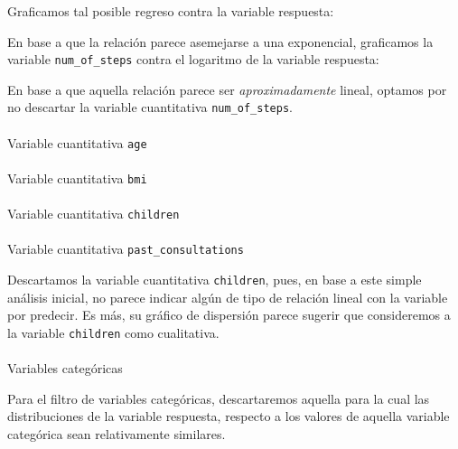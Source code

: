 \documentclass[
]{article}
\makeatletter
\let\oldparagraph\paragraph
\renewcommand{\paragraph}{
    \@ifstar
      \xxxParagraphStar
      \xxxParagraphNoStar
  }
\newcommand{\xxxParagraphStar}[1]{\oldparagraph*{#1}\mbox{}}
\newcommand{\xxxParagraphNoStar}[1]{\oldparagraph{#1}\mbox{}}
\makeatother
\begin{document}
Graficamos tal posible regreso contra la variable respuesta:

En base a que la relación parece asemejarse a una exponencial,
graficamos la variable \texttt{num\_of\_steps} contra el logaritmo de la
variable respuesta:

En base a que aquella relación parece ser \emph{aproximadamente} lineal,
optamos por no descartar la variable cuantitativa
\texttt{num\_of\_steps}.

\paragraph{\texorpdfstring{Variable cuantitativa
\texttt{age}}{Variable cuantitativa age}}\label{variable-cuantitativa-age}

\paragraph{\texorpdfstring{Variable cuantitativa
\texttt{bmi}}{Variable cuantitativa bmi}}\label{variable-cuantitativa-bmi}

\paragraph{\texorpdfstring{Variable cuantitativa
\texttt{children}}{Variable cuantitativa children}}\label{variable-cuantitativa-children}

\paragraph{\texorpdfstring{Variable cuantitativa
\texttt{past\_consultations}}{Variable cuantitativa past\_consultations}}\label{variable-cuantitativa-past_consultations}

Descartamos la variable cuantitativa \texttt{children}, pues, en base a
este simple análisis inicial, no parece indicar algún de tipo de
relación lineal con la variable por predecir. Es más, su gráfico de
dispersión parece sugerir que consideremos a la variable
\texttt{children} como cualitativa.

\paragraph{Variables categóricas}\label{variables-categuxf3ricas}

Para el filtro de variables categóricas, descartaremos aquella para la
cual las distribuciones de la variable respuesta, respecto a los valores
de aquella variable categórica sean relativamente similares.
\end{document}
